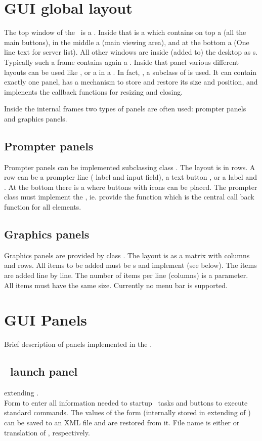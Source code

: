 \section{GUI global layout}
The top window of the \gui\ is a . Inside that is a 
which contains on top a  (all the main buttons), 
in the middle a  (main viewing area), and at the bottom
a  (One line text for server list). 
All other windows are inside (added to) the desktop as s.
Typically such a frame contains again a . Inside that panel various
different layouts can be used like , or a  in a .
In fact, , a subclass of  is used.
It can contain exactly one panel, has a mechanism to store and restore its size and position,
and implenents the callback functions for resizing and closing.

Inside the internal frames two types of panels are often used: prompter panels and
graphics panels.
\subsection{Prompter panels}
Prompter panels can be implemented subclassing class .
The layout is in rows. A row can be a prompter line ( label and  input field),
a text button , or a  label and . At the bottom there is a 
where buttons with icons can be placed. The prompter class must implement the 
, ie. provide the  function which is
the central call back function for all elements.
\subsection{Graphics panels}
Graphics panels are provided by class .
The layout is as a matrix with columns and rows. All items to be added 
must be s and implement  (see below).
The items are added line by line. The number of items per line (columns)
is a parameter. All items must have the same size.
Currently no menu bar is supported.
\section{GUI Panels}
Brief description of panels implemented in the \gui.
\subsection{\dabc\ launch panel}
 extending .\\
Form to enter all information needed to startup \dabc\ tasks and
buttons to execute standard commands.
The values of the form (internally stored in  extending of )
can be saved to an XML file and are restored from it. File name is either
 or translation of , respectively.
